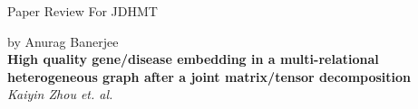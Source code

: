 \begin{center}
        
    \Large{Paper Review For JDHMT} \\
    \author{}{by Anurag Banerjee}\\
    
    \vspace{1em}
    \LARGE{\textbf{High quality gene/disease embedding in a multi-relational\\heterogeneous
    graph after a joint matrix/tensor decomposition}\cite{JDHMT}} \\
    \Large{\textit{Kaiyin Zhou et. al.}} \\

\end{center}